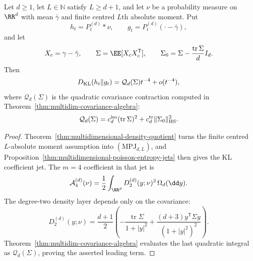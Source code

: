 \begin{corollary}%
\label{cor:multidim-finite-moment-covariance-coefficient}
Let \(d\ge1\), let \(L\in\mathbb N\) satisfy \(L\ge d+1\), and let \(\nu\) be
a probability measure on \(\RR^d\) with mean \(\bar{\gamma}\) and finite
centred \(L\)th absolute moment.  Put
\[
h_t=P_t^{(d)}*\nu,\qquad
g_t=P_t^{(d)}(\cdot-\bar{\gamma}),
\]
and let
\[
X_c=\gamma-\bar{\gamma},\qquad
\Sigma=\EE[X_cX_c^{\mathsf T}],\qquad
\Sigma_0=\Sigma-\frac{\operatorname{tr}\Sigma}{d}I_d .
\]
Then
\begin{equation}\label{eq:finite-moment-covariance-coefficient-through-mpj}
D_{\rm KL}(h_t\|g_t)=\mathcal Q_d(\Sigma)t^{-4}+o(t^{-4}),
\end{equation}
where \(\mathcal Q_d(\Sigma)\) is the quadratic covariance contraction computed
in Theorem~\ref{thm:multidim-covariance-algebra}:
\[
\mathcal Q_d(\Sigma)
=c_d^{\rm iso}(\operatorname{tr}\Sigma)^2
+c_d^{\rm tr}\|\Sigma_0\|_{\rm HS}^2 .
\]
\end{corollary}

\begin{proof}
Theorem~\ref{thm:multidimensional-density-quotient} turns the finite centred
\(L\)-absolute moment assumption into \((\mathrm{MPJ}_{d,L})\), and
Proposition~\ref{thm:multidimensional-poisson-entropy-jets} then gives the KL
coefficient jet.  The \(m=4\) coefficient in that jet is
\[
\mathcal A_4^{(d)}(\nu)
=\frac12\int_{\RR^d}D_2^{(d)}(y;\nu)^2\,\Omega_d(\dd y).
\]
The degree-two density layer depends only on the covariance:
\[
D_2^{(d)}(y;\nu)=
\frac{d+1}{2}\left(
-\frac{\operatorname{tr}\Sigma}{1+|y|^2}
+\frac{(d+3)y^{\mathsf T}\Sigma y}{(1+|y|^2)^2}
\right).
\]
Theorem~\ref{thm:multidim-covariance-algebra} evaluates the last
quadratic integral as \(\mathcal Q_d(\Sigma)\), proving the asserted leading
term.
\end{proof}
